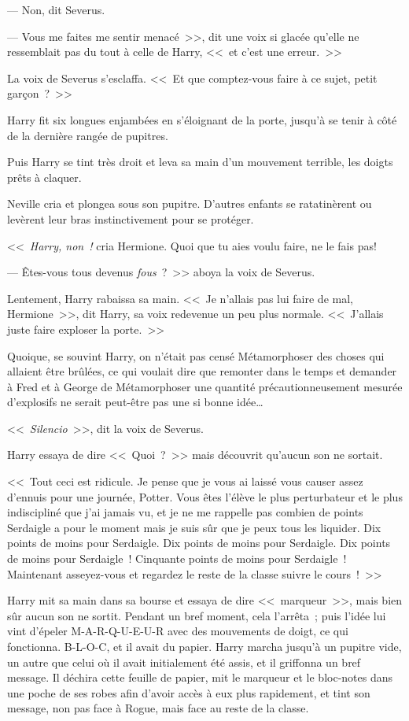 --- Non, dit Severus.

--- Vous me faites me sentir menacé~>>, dit une voix si glacée qu'elle ne ressemblait pas du tout à celle de Harry, <<~et c'est une erreur.~>>

La voix de Severus s'esclaffa. <<~Et que comptez-vous faire à ce sujet, petit garçon~?~>>

Harry fit six longues enjambées en s'éloignant de la porte, jusqu'à se tenir à côté de la dernière rangée de pupitres.

Puis Harry se tint très droit et leva sa main d'un mouvement terrible, les doigts prêts à claquer.

Neville cria et plongea sous son pupitre. D'autres enfants se ratatinèrent ou levèrent leur bras instinctivement pour se protéger.

<<~\emph{Harry, non~!} cria Hermione. Quoi que tu aies voulu faire, ne le fais pas!

--- Êtes-vous tous devenus \emph{fous}~?~>> aboya la voix de Severus.

Lentement, Harry rabaissa sa main. <<~Je n'allais pas lui faire de mal, Hermione~>>, dit Harry, sa voix redevenue un peu plus normale. <<~J'allais juste faire exploser la porte.~>>

Quoique, se souvint Harry, on n'était pas censé Métamorphoser des choses qui allaient être brûlées, ce qui voulait dire que remonter dans le temps et demander à Fred et à George de Métamorphoser une quantité précautionneusement mesurée d'explosifs ne serait peut-être pas une si bonne idée…

<<~\emph{Silencio}~>>, dit la voix de Severus.

Harry essaya de dire <<~Quoi~?~>> mais découvrit qu'aucun son ne sortait.

<<~Tout ceci est ridicule. Je pense que je vous ai laissé vous causer assez d'ennuis pour une journée, Potter. Vous êtes l'élève le plus perturbateur et le plus indiscipliné que j'ai jamais vu, et je ne me rappelle pas combien de points Serdaigle a pour le moment mais je suis sûr que je peux tous les liquider. Dix points de moins pour Serdaigle. Dix points de moins pour Serdaigle. Dix points de moins pour Serdaigle~! Cinquante points de moins pour Serdaigle~! Maintenant asseyez-vous et regardez le reste de la classe suivre le cours~!~>>

Harry mit sa main dans sa bourse et essaya de dire <<~marqueur~>>, mais bien sûr aucun son ne sortit. Pendant un bref moment, cela l'arrêta~; puis l'idée lui vint d'épeler M-A-R-Q-U-E-U-R avec des mouvements de doigt, ce qui fonctionna. B-L-O-C, et il avait du papier. Harry marcha jusqu'à un pupitre vide, un autre que celui où il avait initialement été assis, et il griffonna un bref message. Il déchira cette feuille de papier, mit le marqueur et le bloc-notes dans une poche de ses robes afin d'avoir accès à eux plus rapidement, et tint son message, non pas face à Rogue, mais face au reste de la classe.

